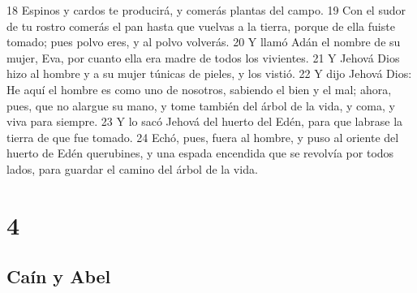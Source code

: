 18 Espinos y cardos te producirá, y comerás plantas del campo.
19 Con el sudor de tu rostro comerás el pan hasta que vuelvas a la tierra, porque de ella fuiste tomado; pues polvo eres, y al polvo volverás.
20 Y llamó Adán el nombre de su mujer, Eva, por cuanto ella era madre de todos los vivientes.
21 Y Jehová Dios hizo al hombre y a su mujer túnicas de pieles, y los vistió.
22 Y dijo Jehová Dios: He aquí el hombre es como uno de nosotros, sabiendo el bien y el mal; ahora, pues, que no alargue su mano, y tome también del árbol de la vida, y coma, y viva para siempre.
23 Y lo sacó Jehová del huerto del Edén, para que labrase la tierra de que fue tomado.
24 Echó, pues, fuera al hombre, y puso al oriente del huerto de Edén querubines, y una espada encendida que se revolvía por todos lados, para guardar el camino del árbol de la vida.

\chapter{4}

\section*{Caín y Abel}

